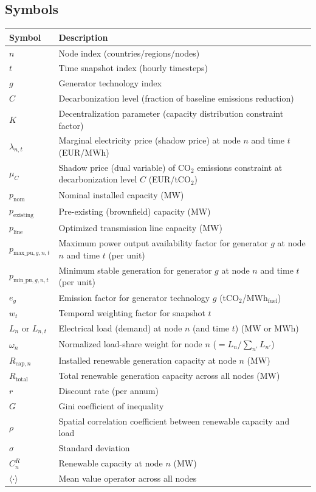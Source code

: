 \documentclass[preprint,12pt,nopreprintline]{elsarticle}
\begin{document}
\subsection*{Symbols}
\small
\begin{tabular}{lp{10cm}}
\toprule
\textbf{Symbol} & \textbf{Description} \\
\midrule
$n$ & Node index (countries/regions/nodes) \\
$t$ & Time snapshot index (hourly timesteps) \\
$g$ & Generator technology index \\
$C$ & Decarbonization level (fraction of baseline emissions reduction) \\
$K$ & Decentralization parameter (capacity distribution constraint factor) \\
$\lambda_{n,t}$ & Marginal electricity price (shadow price) at node $n$ and time $t$ (EUR/MWh) \\
$\mu_C$ & Shadow price (dual variable) of CO$_2$ emissions constraint at decarbonization level $C$ (EUR/tCO$_2$) \\
$p_{\text{nom}}$ & Nominal installed capacity (MW) \\
$p_{\text{existing}}$ & Pre-existing (brownfield) capacity (MW) \\
$p_{\text{line}}$ & Optimized transmission line capacity (MW) \\
$p_{\text{max\_pu},g,n,t}$ & Maximum power output availability factor for generator $g$ at node $n$ and time $t$ (per unit) \\
$p_{\text{min\_pu},g,n,t}$ & Minimum stable generation for generator $g$ at node $n$ and time $t$ (per unit) \\
$e_g$ & Emission factor for generator technology $g$ (tCO$_2$/MWh$_{\text{fuel}}$) \\
$w_t$ & Temporal weighting factor for snapshot $t$ \\
$L_{n}$ or $L_{n,t}$ & Electrical load (demand) at node $n$ (and time $t$) (MW or MWh) \\
$\omega_n$ & Normalized load-share weight for node $n$ ($= L_n / \sum_{n'} L_{n'}$) \\
$R_{\text{cap},n}$ & Installed renewable generation capacity at node $n$ (MW) \\
$R_{\text{total}}$ & Total renewable generation capacity across all nodes (MW) \\
$r$ & Discount rate (per annum) \\
$G$ & Gini coefficient of inequality \\
$\rho$ & Spatial correlation coefficient between renewable capacity and load \\
$\sigma$ & Standard deviation \\
$C_n^R$ & Renewable capacity at node $n$ (MW) \\
$\langle \cdot \rangle$ & Mean value operator across all nodes \\
\bottomrule
\end{tabular}
\end{document}
